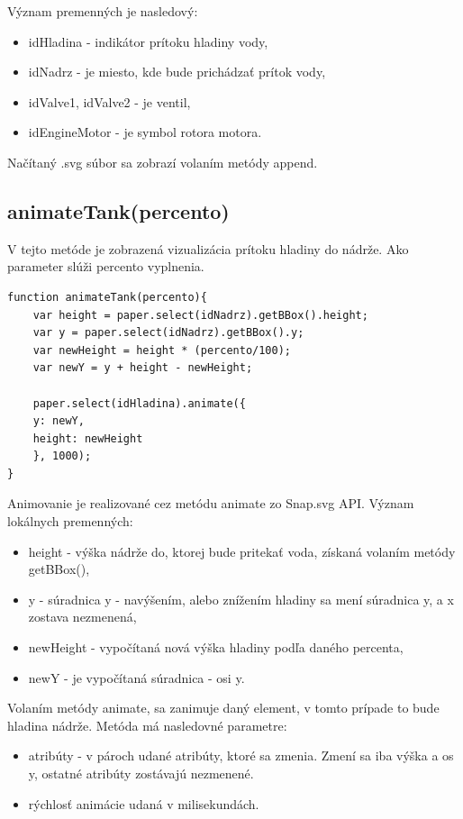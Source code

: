 Význam premenných je nasledový: 
\begin{itemize}
	\item idHladina - indikátor prítoku hladiny vody, 
	\item idNadrz - je miesto, kde bude prichádzať prítok vody,
	\item idValve1, idValve2 - je ventil, 
	\item idEngineMotor - je symbol rotora motora.
\end{itemize}

Načítaný .svg súbor sa zobrazí volaním metódy append. 

\subsection{animateTank(percento)}
V tejto metóde je zobrazená vizualizácia prítoku hladiny do nádrže. Ako parameter slúži percento vyplnenia. 

\begin{lstlisting}
function animateTank(percento){
	var height = paper.select(idNadrz).getBBox().height;
	var y = paper.select(idNadrz).getBBox().y;
	var newHeight = height * (percento/100);
	var newY = y + height - newHeight;
	
	paper.select(idHladina).animate({
	y: newY,
	height: newHeight
	}, 1000);
}
\end{lstlisting}

Animovanie je realizované cez metódu animate zo Snap.svg API. 
Význam lokálnych premenných: 
\begin{itemize}
	\item height - výška nádrže do, ktorej bude pritekať voda,  získaná volaním metódy getBBox(),
	\item y - súradnica y - navýšením, alebo znížením hladiny sa mení súradnica y, a x zostava nezmenená,
	\item newHeight - vypočítaná nová výška hladiny podľa daného percenta, 
	\item newY - je vypočítaná súradnica - osi y. 
\end{itemize}

Volaním metódy animate, sa zanimuje daný element, v tomto prípade to bude hladina nádrže. Metóda má nasledovné parametre: \begin{itemize}
	\item atribúty - v pároch udané atribúty, ktoré sa zmenia. Zmení sa iba výška a os y, ostatné atribúty zostávajú nezmenené.
	\item rýchlosť animácie udaná v milisekundách. 
\end{itemize}


